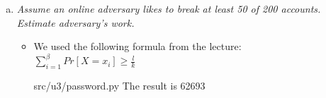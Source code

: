 \begin{enumerate}[(a)]
    \item {\itshape Assume  an  online  adversary  likes  to  break  at  least  50  of  200  accounts.  Estimate adversary’s work.}
    \begin{itemize}
    \item We used the following formula from the lecture:
        \\{\Large $ \sum_{i=1}^ \beta Pr[X = x_i] \ge \frac {l} {k} $}
        
            {src/u3/password.py}
        The result is 62693
    \end{itemize}
    
    

    

\end{enumerate}
